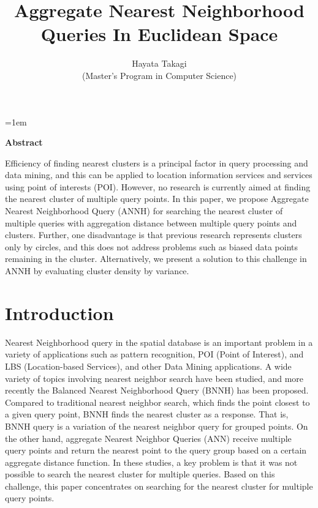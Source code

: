 \documentclass[a4paper,11pt]{report}
\title{Aggregate Nearest Neighborhood Queries In Euclidean Space}
\author{Hayata Takagi\\ (Master's Program in Computer Science)}
\theoremstyle{mytheoremstyle}
\begin{document}
\maketitle
\thispagestyle{empty}
\newpage

\thispagestyle{empty}
\vspace*{20pt plus 1fil}
\parindent=1em
\noindent

\begin{center}
    \textbf{Abstract}
\end{center}
\vspace{0.2in}

Efficiency of finding nearest clusters is a principal factor in query processing and data mining, and this can be applied to location information services and services using point of interests (POI). However, no research is currently aimed at finding the nearest cluster of multiple query points. In this paper, we propose Aggregate Nearest Neighborhood Query (ANNH) for searching the nearest cluster of multiple queries with aggregation distance between multiple query points and clusters. Further, one disadvantage is that previous research represents clusters only by circles, and this does not address problems such as biased data points remaining in the cluster. Alternatively, we present a solution to this challenge in ANNH by evaluating cluster density by variance.

\par
\vspace{0pt plus 1fil}
\newpage

\tableofcontents
\listoffigures

\pagebreak \setcounter{page}{1}


\chapter{Introduction}
Nearest Neighborhood query in the spatial database is an important problem in a variety of applications such as pattern recognition, POI (Point of Interest), and LBS (Location-based Services), and other Data Mining applications\cite{adeniyi2016automated}. A wide variety of topics involving nearest neighbor search have been studied, and more recently the Balanced Nearest Neighborhood Query (BNNH)\cite{BNNH} has been proposed. Compared to traditional nearest neighbor search, which finds the point closest to a given query point, BNNH finds the nearest cluster as a response. That is, BNNH query is a variation of the nearest neighbor query for grouped points. On the other hand, aggregate Nearest Neighbor Queries (ANN)\cite{ANN} receive multiple query points and return the nearest point to the query group based on a certain aggregate distance function. In these studies, a key problem is that it was not possible to search the nearest cluster for multiple queries. Based on this challenge, this paper concentrates on searching for the nearest cluster for multiple query points.
\end{document}
